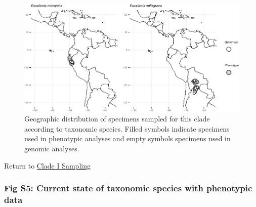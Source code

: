 \documentclass[
  11pt,
]{article}
\begin{document}
\begin{figure}

{\centering \includegraphics{Supplementary_Material_files/figure-latex/CladeIsamplingMaps-1} 

}

\caption{Geographic distribution of specimens sampled for this clade according to taxonomic species. Filled symbols indicate specimens used in phenotypic analyses and empty symbols specimens used in genomic analyses.}\label{fig:CladeIsamplingMaps}
\end{figure}

Return to \protect\hyperlink{sampling-1}{Clade I Sampling}
\pagebreak

\hypertarget{fig-s5-current-state-of-taxonomic-species-with-phenotypic-data}{%
\subsubsection{Fig S5: Current state of taxonomic species with phenotypic data}\label{fig-s5-current-state-of-taxonomic-species-with-phenotypic-data}}
\end{document}
